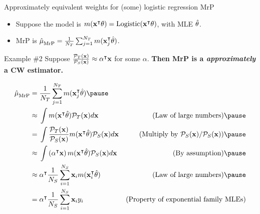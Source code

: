 
\begin{frame}[t]{Approximately equivalent weights for (some) logistic regression MrP}

\def\alphav{\mathbf{\alpha}}
%
\begin{itemize}
    \item Suppose the model is $m(\mathbf{x}^\intercal \theta) = \mathrm{Logistic}(\mathbf{x}^\intercal \theta)$, with MLE $\hat{\theta}$.
    \item MrP is $\hat{\mu}^{}_{\mathrm{MrP}} = \frac{1}{{N_T}} \sum_{j=1}^{N_T} m(\mathbf{x}_j^\intercal \hat{\theta})$.
\end{itemize}
%
\begin{block}{Example \#2}
Suppose
    $\frac{\ptar(\x)}{\psur(\x)} \approx \alphav^\trans \x$ for some $\alpha$.
    \textbf{Then MrP is a \emph{approximately} a CW estimator.}
\end{block}\pause

$$
\begin{aligned}
\muhat_\mrp ={}& \meantar \m(\x_j^\trans \thetahat) \pause
\\ \approx{}&
    \int \m(\x^\trans \thetahat) \ptar(\x) d\x
    & \textrm{(Law of large numbers)} \pause
\\ ={}&
    \int \frac{\ptar(\x)}{\psur(\x)} \m(\x^\trans \thetahat) \psur(\x) d\x
    & \textrm{(Multiply by $\psur(\x) / \psur(\x)$)} \pause
\\ \approx{}&
    \int \left( \alphav^\trans \x\right) \m(\x^\trans \thetahat) \psur(\x) d\x
    & \textrm{(By assumption)} \pause
\\ \approx{}&
    \alphav^\trans \meansur \x_i \m(\x_i^\trans \thetahat)
    & \textrm{(Law of large numbers)}\pause
\\={}&
    \alphav^\trans \meansur \x_i \y_i
    & \textrm{(Property of exponential family MLEs)}
\end{aligned}
$$


\end{frame}



